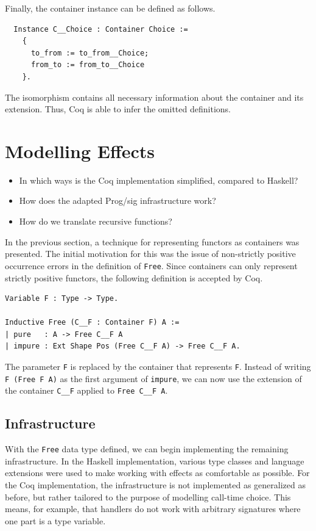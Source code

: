 \documentclass[a4paper, 11pt, fleqn, twoside]{scrreprt}
\newcommand{\cinl}[1]{\texttt{#1}}
\begin{document}
Finally, the container instance can be defined as follows.

\begin{verbatim}
  Instance C__Choice : Container Choice :=
    {
      to_from := to_from__Choice;
      from_to := from_to__Choice
    }.
\end{verbatim}

The isomorphism contains all necessary information about the container and its extension.
Thus, Coq is able to infer the omitted definitions.

\section{Modelling Effects}
\begin{itemize}
\item In which ways is the Coq implementation simplified, compared to Haskell?
\item How does the adapted Prog/sig infrastructure work?
\item How do we translate recursive functions?
\end{itemize}

In the previous section, a technique for representing functors as containers was presented.
The initial motivation for this was the issue of non-strictly positive occurrence errors in the definition of \cinl{Free}.
Since containers can only represent strictly positive functors, the following definition is accepted by Coq.

\begin{verbatim}
Variable F : Type -> Type.

Inductive Free (C__F : Container F) A :=
| pure   : A -> Free C__F A
| impure : Ext Shape Pos (Free C__F A) -> Free C__F A.
\end{verbatim}

The parameter \cinl{F} is replaced by the container that represents \cinl{F}.
Instead of writing \cinl{F (Free F A)} as the first argument of \cinl{impure}, we can now use the extension of the container \cinl{C__F} applied to \cinl{Free C__F A}.

\subsection{Infrastructure}
\label{subsec:infrastructure}

With the \cinl{Free} data type defined, we can begin implementing the remaining infrastructure. 
In the Haskell implementation, various type classes and language extensions were used to make working with effects as comfortable as possible.
For the Coq implementation, the infrastructure is not implemented as generalized as before, but rather tailored to the purpose of modelling call-time choice.
This means, for example, that handlers do not work with arbitrary signatures where one part is a type variable.
\end{document}
